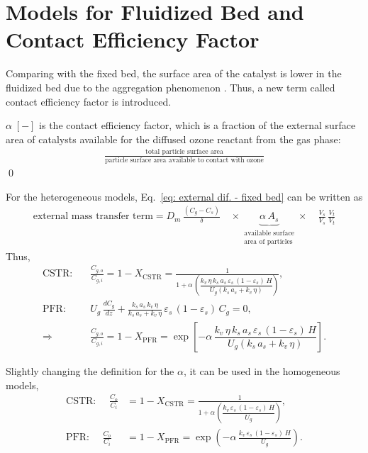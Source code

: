 \section{Models for Fluidized Bed and Contact Efficiency Factor}
Comparing with the fixed bed, the surface area of the catalyst is lower in the fluidized bed due to the aggregation phenomenon \citep{wang2015performance}. 
Thus, a new term called contact efficiency factor is introduced. 

\begin{definition}
    $\alpha\; [-]$ is the contact efficiency factor, which is a fraction of the external surface area of catalysts available for the diffused ozone reactant from the gas phase:
    \begin{align*}
        \frac{\text{total particle surface area}}{\text{particle surface area available to contact with ozone}}
    \end{align*}
    \qed
\end{definition}
For the heterogeneous models, Eq.~\eqref{eq: external dif. - fixed bed} can be written as 
\begin{align*}
    \text{external mass transfer term} =
    D_m\,\frac{(C_g-C_s)}{\delta}
    \quad \times
    \underbrace{\alpha\, A_s}_{\substack{\text{available surface}\\ \text{area of particles}}} 
    \times \quad
    \frac{V_s}{V_s}\,\frac{V_t}{V_t}
\end{align*}
Thus, 
\begin{align}
    \text{CSTR:} \quad
    & \frac{C_{g,o}}{C_{g,i}} = 1- X_\text{CSTR}
    = \frac{1}{1+ \alpha\,\left(
        \dfrac{k_v\,\eta\,k_s\,a_s\,\varepsilon_s\,(1-\varepsilon_s)\,H}{U_g(k_s\, a_s + k_v\,\eta)}
        \right)},
    \label{eq: CSTR in CFB}\\
    \text{PFR:} \quad
    & U_g\,\frac{dC_{g}}{dz} + \frac{k_s\,a_s\,k_v\,\eta}{k_s\,a_s + k_v\,\eta}\,\varepsilon_s\,(1-\varepsilon_s)\,C_g = 0, \\
    \Longrightarrow \quad 
    & \frac{C_{g,o}}{C_{g,i}} = 1- X_\text{PFR}
    = \exp \left[
        - \alpha\,\dfrac{k_v\,\eta\,k_s\,a_s\,\varepsilon_s\,(1-\varepsilon_s)\,H}{U_g(k_s\, a_s + k_v\,\eta)}  
    \right].
    \label{eq: PFR in CFB}
\end{align}

Slightly changing the definition for the $\alpha$, it can be used in the homogeneous models,
\begin{align}
    \text{CSTR: }\quad
    \frac{C_o}{C_i} &= 1-X_\text{CSTR} 
    = \frac{1}{1+\alpha\,\left(\dfrac{k_v\, \varepsilon_s \,(1-\varepsilon_s) \, H}{U_g}\right)},
    \label{eq: homo - CSTR}
    \\
    \text{PFR: }\quad
    \frac{C_o}{C_i} &= 1-X_\text{PFR} 
    = \exp{\left( -\alpha\,\frac{k_v\, \varepsilon_s \, (1-\varepsilon_s) \, H}{U_g} \right)}.
    \label{eq: homo - PFR}
\end{align}


